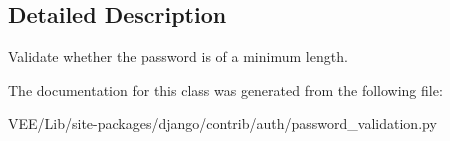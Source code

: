 \subsection{Detailed Description}
\begin{DoxyVerb}Validate whether the password is of a minimum length.
\end{DoxyVerb}
 

The documentation for this class was generated from the following file\+:\begin{DoxyCompactItemize}
\item 
V\+E\+E/\+Lib/site-\/packages/django/contrib/auth/password\+\_\+validation.\+py\end{DoxyCompactItemize}
